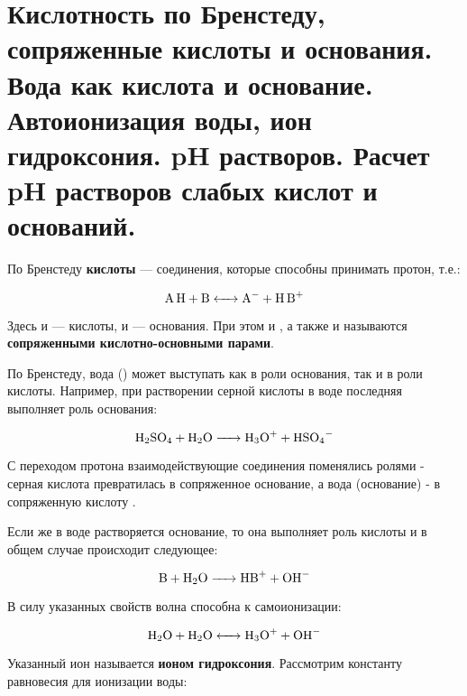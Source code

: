 \section{Кислотность по Бренстеду, сопряженные кислоты и основания. Вода как кислота и основание. Автоионизация воды, ион гидроксония. pH растворов. Расчет pH растворов слабых кислот и оснований.}

По Бренстеду \textbf{кислоты} --- соединения, которые способны принимать протон, т.е.:

\begin{equation}
	\ce{A H + B <-> A- + H B+}
\end{equation}

Здесь  и  --- кислоты,  и  --- основания. При этом  и , а также  и  называются \textbf{сопряженными кислотно-основными парами}.


По Бренстеду, вода () может выступать как в роли основания, так и в роли кислоты. Например, при растворении серной кислоты в воде последняя выполняет роль основания:

\begin{equation}
	\ce{H2SO4 + H2O -> H3O+ + HSO4-}
\end{equation}

С переходом протона взаимодействующие соединения поменялись ролями - серная кислота превратилась в сопряженное основание, а вода (основание) - в сопряженную кислоту .

Если же в воде растворяется основание, то она выполняет роль кислоты и в общем случае происходит следующее:

\begin{equation}
	\ce{B + H2O -> HB+ + OH-}
\end{equation}

В силу указанных свойств волна способна к самоионизации:

\begin{equation}
	\ce{H2O + H2O <-> H3O+ + OH-}
\end{equation}

Указанный ион  называется \textbf{ионом гидроксония}. Рассмотрим константу равновесия для ионизации воды: